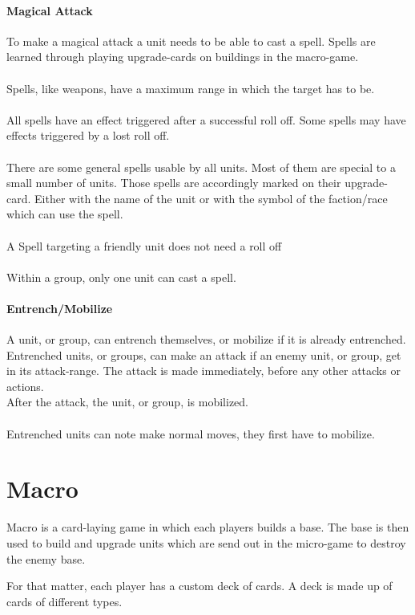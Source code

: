 \documentclass[a5paper,pagesize,10pt,bibtotoc,pointlessnumbers,
normalheadings,DIV=9,twoside=false]{scrbook}
\begin{document}
\subsubsection{Magical Attack}
To make a magical attack a unit needs to be able to cast a spell. Spells are learned through playing upgrade-cards on buildings in the macro-game.\\
\\
Spells, like weapons, have a maximum range in which the target has to be.\\
\\
All spells have an effect triggered after a successful roll off. Some spells may have effects triggered by a lost roll off.\\
\\
There are some general spells usable by all units. Most of them are special to a small number of units. Those spells are accordingly marked on their upgrade-card. Either with the name of the unit or with the symbol of the faction/race which can use the spell.\\
\\
A Spell targeting a friendly unit does not need a roll off\\
\\
Within a group, only one unit can cast a spell.

\subsubsection{Entrench/Mobilize}
A unit, or group, can entrench themselves, or mobilize if it is already entrenched.
Entrenched units, or groups, can make an attack if an enemy unit, or group, get in its attack-range.
The attack is made immediately, before any other attacks or actions.\\
After the attack, the unit, or group, is mobilized.\\
\\
Entrenched units can note make normal moves, they first have to mobilize.

\chapter{Macro}
Macro is a card-laying game in which each players builds a base. The base is then used to build and upgrade units which are send out in the micro-game to destroy the enemy base.

For that matter, each player has a custom deck of cards. A deck is made up of cards of different types.
\end{document}
